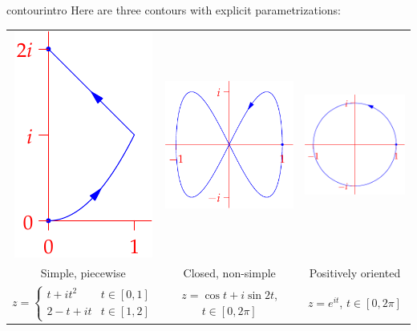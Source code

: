 \begin{examples}{}{contourintro}
Here are three contours with explicit parametrizations:\vspace{-5pt}
\begin{center}
\begin{tabular}{c@{\qquad}c@{\qquad}c}
\includegraphics[scale=0.9]{contours-ex1}
&
\includegraphics[scale=0.9]{contours-ex2}
&
\includegraphics[scale=0.9]{contours-ex3}
\\
Simple, piecewise
&
Closed, non-simple
&
Positively oriented
\\[2pt]
$z=\begin{cases}
t+it^2&t\in[0,1]\\
2-t+it&t\in[1,2]
\end{cases}$
&
$z=\cos t+i\sin 2t$, $t\in[0,2\pi]$
&
$z=e^{it}$, $t\in[0,2\pi]$
\end{tabular}
\end{center}
\end{examples}

